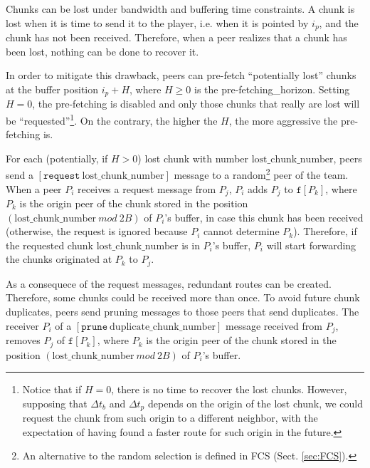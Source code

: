 

\label{sec:routes_discovery}

Chunks can be lost under bandwidth and buffering time constraints. A
chunk is lost when it is time to send it to the player, i.e. when it
is pointed by $i_p$, and the chunk has not been received. Therefore,
when a peer realizes that a chunk has been lost, nothing can be done
to recover it.

In order to mitigate this drawback, peers can pre-fetch ``potentially
lost'' chunks at the buffer position $i_p+H$, where $H\geq 0$ is the
\gls{pre-fetching_horizon}. Setting $H=0$, the pre-fetching is
disabled and only those chunks that really are lost will be
``requested''\footnote{Notice that if $H=0$, there is no time to
  recover the lost chunks. However, supposing that $\Delta t_b$ and
  $\Delta t_p$ depends on the origin of the lost chunk, we could
  request the chunk from such origin to a different neighbor, with the
  expectation of having found a faster route for such origin in the
  future.}. On the contrary, the higher the $H$, the more aggressive
the pre-fetching is.


For each (potentially, if $H>0$) lost chunk with number
$\text{lost\_chunk\_number}$, peers send a
$[\mathtt{request}~\text{lost\_chunk\_number}]$ message to a
random\footnote{An alternative to the random selection is defined in
  FCS (Sect. \ref{sec:FCS}).} peer of the team. When a peer $P_i$
receives a request message from $P_j$, $P_i$ adds $P_j$ to
$\mathtt{f}[P_k]$, where $P_k$ is the origin peer of the chunk
stored in the position $(\text{lost\_chunk\_number}~\mathit{mod}~2B)$
of $P_i$'s buffer, in case this chunk has been received (otherwise,
the request is ignored because $P_i$ cannot determine
$P_k$). Therefore, if the requested chunk $\text{lost\_chunk\_number}$
is in $P_i$'s buffer, $P_i$ will start forwarding the chunks
originated at $P_k$ to $P_j$.

As a consequece of the request messages, redundant routes can be
created. Therefore, some chunks could be received more than once. To
avoid future chunk duplicates, peers send pruning messages to those
peers that send duplicates. The receiver $P_i$ of a
$[\mathtt{prune}~\text{duplicate\_chunk\_number}]$ message received
from $P_j$, removes $P_j$ of $\mathtt{f}[P_k]$, where $P_k$ is
the origin peer of the chunk stored in the position
$(\text{lost\_chunk\_number}~\mathit{mod}~2B)$ of $P_i$'s buffer.

